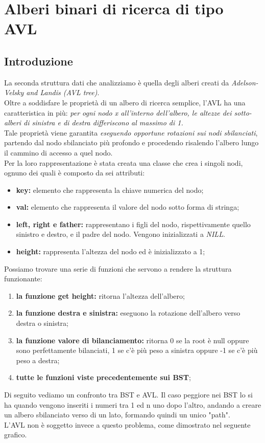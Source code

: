 \documentclass[a4paper]{article}
\begin{document}
		 \newpage
		 
		\section{Alberi binari di ricerca di tipo AVL}
			\subsection{Introduzione}
			La seconda struttura dati che analizziamo è quella degli alberi creati da \textit{Adelson-Velsky and Landis (AVL tree)}.\\
			Oltre a soddisfare le proprietà di un albero di ricerca semplice, l'AVL ha una caratteristica in più: \textit{per ogni nodo x all'interno dell'albero, le altezze dei sotto-alberi di sinistra e di destra differiscono al massimo di 1.}\\
			Tale proprietà viene garantita \textit{eseguendo opportune rotazioni sui nodi sbilanciati}, partendo dal nodo sbilanciato più profondo e procedendo risalendo l'albero lungo il cammino di accesso a quel nodo.\\
			Per la loro rappresentazione è stata creata una classe che crea i singoli nodi, ognuno dei quali è composto da sei attributi:
			\begin{itemize}
				\item \textbf{key:} elemento che rappresenta la chiave numerica del nodo;
				\item \textbf{val:} elemento che rappresenta il valore del nodo sotto forma di stringa;
				\item \textbf{left, right e father:} rappresentano i figli del nodo, rispettivamente quello sinistro e destro, e il padre del nodo. Vengono inizializzati a \textit{NILL}.
				\item \textbf{height:} rappresenta l'altezza del nodo ed è inizializzato a 1;
			\end{itemize}
			Possiamo trovare una serie di funzioni che servono a rendere la struttura funzionante:
			\begin{enumerate}
				\item \textbf{la funzione get height:} ritorna l'altezza dell'albero;
				\item \textbf{la funzione destra e sinistra:} eseguono la rotazione dell'albero verso destra o sinistra;
				\item \textbf{la funzione valore di bilanciamento:} ritorna 0 se la root è null oppure sono perfettamente bilanciati, 1 se c'è più peso a sinistra oppure -1 se c'è più peso a destra;
				\item \textbf{tutte le funzioni viste precedentemente sui BST};
			\end{enumerate}
		\newpage
			Di seguito vediamo un confronto tra BST e AVL. Il caso peggiore nei BST lo si ha quando vengono inseriti i numeri tra 1 ed n uno dopo l'altro, andando a creare un albero sbilanciato verso di un lato, formando quindi un unico "path".\\
			L'AVL non è soggetto invece a questo problema, come dimostrato nel seguente grafico.\\
			 			
\end{document}
